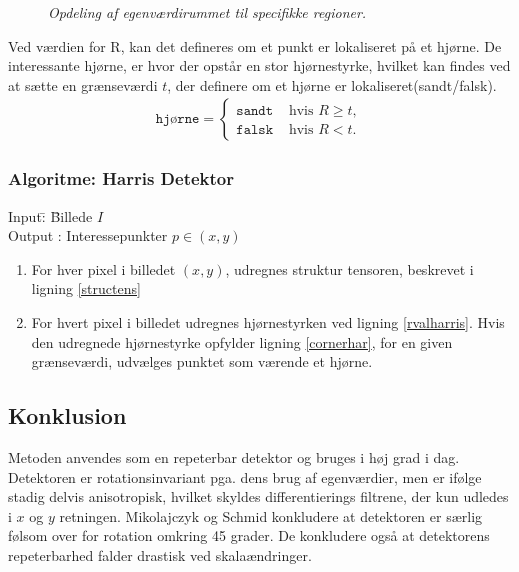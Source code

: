 \begin{enumerate}
{\begin{figure}[H]
     \vspace{-1em}
    \begin{center}    
       \caption{{\footnotesize \textit{ Opdeling af egenværdirummet til specifikke regioner. }}}
    \label{fig:egen}
     \end{center}
     \vspace{-2.5em}
  \end{figure} \noindent
Ved værdien for R, kan det defineres om et punkt er lokaliseret på et hjørne. De interessante hjørne, er hvor der opstår en stor hjørnestyrke, hvilket kan findes ved at sætte en grænseværdi $t$, der definere om et hjørne er lokaliseret(sandt/falsk).
\begin{equation}
\begin{split}
\texttt{hjørne} = 
\begin{cases}
\texttt{sandt}& \text{hvis } R\geq t, \\
\texttt{falsk }& \text{hvis } R < t.
\end{cases}
\end{split}
\label{cornerhar}
\end{equation}
}
\end{enumerate}
\subsubsection*{Algoritme: Harris Detektor}
\begin{tabbing}
Input\quad \= : \= Billede $I$\\
Output \text{ } \> : \> Interessepunkter $p \in (x,y)$
\end{tabbing}
\begin{enumerate}
\item{For hver pixel i billedet $(x,y)$, udregnes struktur tensoren, beskrevet i ligning \eqref{structens}}
\item{For hvert pixel i billedet udregnes hjørnestyrken ved ligning \eqref{rvalharris}.  Hvis den udregnede hjørnestyrke opfylder ligning \ref{cornerhar}, for en given grænseværdi, udvælges punktet som værende et hjørne.}
\end{enumerate}
\subsection{Konklusion}
Metoden anvendes som en repeterbar detektor og bruges i høj grad i dag. Detektoren er rotationsinvariant pga. dens brug af egenværdier, men er ifølge \cite{eval} stadig delvis anisotropisk, hvilket skyldes differentierings filtrene, der kun udledes i $x$ og $y$ retningen. Mikolajczyk og Schmid \cite{eval1} konkludere at detektoren er særlig følsom over for rotation omkring 45 grader. De konkludere også at detektorens repeterbarhed falder drastisk ved skalaændringer.